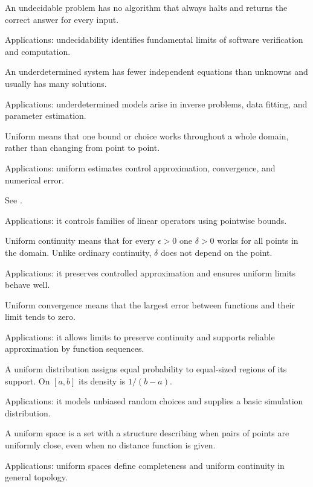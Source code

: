 An undecidable problem has no algorithm that always halts and returns the correct answer for every input. \par\noindent Applications: undecidability identifies fundamental limits of software verification and computation.

An underdetermined system has fewer independent equations than unknowns and usually has many solutions. \par\noindent Applications: underdetermined models arise in inverse problems, data fitting, and parameter estimation.

Uniform means that one bound or choice works throughout a whole domain, rather than changing from point to point. \par\noindent Applications: uniform estimates control approximation, convergence, and numerical error.

See . \par\noindent Applications: it controls families of linear operators using pointwise bounds.

Uniform continuity means that for every $\epsilon>0$ one $\delta>0$ works for all points in the domain. Unlike ordinary continuity, $\delta$ does not depend on the point. \par\noindent Applications: it preserves controlled approximation and ensures uniform limits behave well.

Uniform convergence means that the largest error between functions and their limit tends to zero. \par\noindent Applications: it allows limits to preserve continuity and supports reliable approximation by function sequences.

A uniform distribution assigns equal probability to equal-sized regions of its support. On $[a,b]$ its density is $1/(b-a)$. \par\noindent Applications: it models unbiased random choices and supplies a basic simulation distribution.

A uniform space is a set with a structure describing when pairs of points are uniformly close, even when no distance function is given. \par\noindent Applications: uniform spaces define completeness and uniform continuity in general topology.

